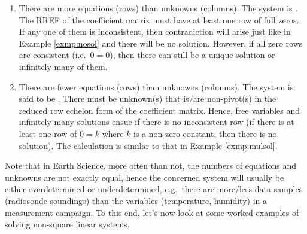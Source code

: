 \begin{enumerate}
\item There are more equations (rows) than unknowns (columns). The system is . The RREF of the coefficient matrix must have at least one row of full zeros. If any one of them is inconsistent, then contradiction will arise just like in Example \ref{exmp:nosol} and there will be no solution. However, if all zero rows are consistent (i.e.\ $0=0$), then there can still be a unique solution or infinitely many of them.
\item There are fewer equations (rows) than unknowns (columns). The system is said to be . There must be unknown(s) that is/are non-pivot(s) in the reduced row echelon form of the coefficient matrix. Hence, free variables and infinitely many solutions ensue if there is no inconsistent row (if there is at least one row of $0 = k$ where $k$ is a non-zero constant, then there is no solution). The calculation is similar to that in Example \ref{exmp:mulsol}.
\end{enumerate}
Note that in Earth Science, more often than not, the numbers of equations and unknowns are not exactly equal, hence the concerned system will usually be either overdetermined or underdetermined, e.g.\ there are more/less data samples (radiosonde soundings) than the variables (temperature, humidity) in a measurement campaign. To this end, let's now look at some worked examples of solving non-square linear systems.
